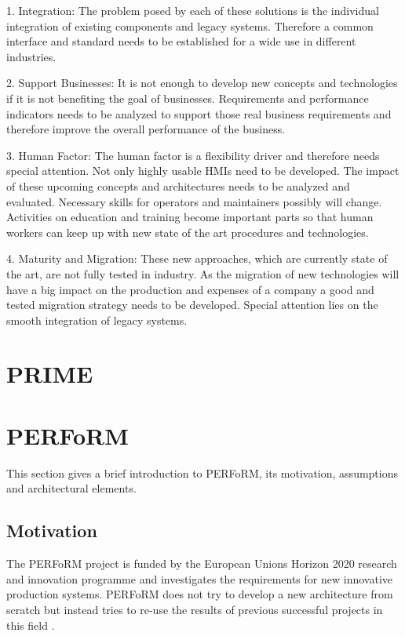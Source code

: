\documentclass[conference,compsoc,hidelinks]{IEEEtran}
\begin{document}
1. Integration: The problem posed by each of these solutions is the individual integration of existing components and legacy systems. Therefore a common interface and standard needs to be established for a wide use in different industries.

2. Support Businesses: It is not enough to develop new concepts and technologies if it is not benefiting the goal of businesses. Requirements and performance indicators needs to be analyzed to support those real business requirements and therefore improve the overall performance of the business.

3. Human Factor:  The human factor is a flexibility driver and therefore needs special attention. Not only highly usable HMIs need to be developed. The impact of these upcoming concepts and architectures needs to be analyzed and evaluated. Necessary skills for operators and maintainers possibly will change. Activities on education and training become important parts so that human workers can keep up with new state of the art procedures and technologies.

4. Maturity and Migration: These new approaches, which are currently state of the art, are not fully tested in industry. As the migration of new technologies will have a big impact on the production and expenses of a company a good and tested migration strategy needs to be developed. Special attention lies on the smooth integration of legacy systems.

\section{PRIME} \label{PRIME}%
\lipsum[1-10]

\section{PERFoRM} \label{PERFoRM} %
This section gives a brief introduction to PERFoRM, its motivation, assumptions and architectural elements.

\subsection{Motivation}
The PERFoRM project is funded by the European Unions Horizon 2020 research and innovation programme and investigates the requirements for new innovative production systems. PERFoRM does not try to develop a new architecture from scratch but instead tries to re-use the results of previous successful projects in this field \cite{SpecPERFoRM}. 
\end{document}
